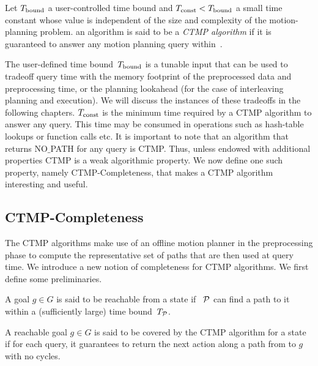 \documentclass[a4paper]{report}
\begin{document}
\begin{definition}
\label{ctmp:def}
Let $T_{\textrm{bound}}$ a user-controlled time bound
and
$T_{\textrm{const}} < T_{\textrm{bound}}$ a small time constant whose value is independent of the size and complexity of the motion-planning problem.
%
an algorithm is said to be a \emph{CTMP algorithm} if it is guaranteed to answer any motion planning query within~\Tbound.
\end{definition}

The user-defined time bound~$T_{\textrm{bound}}$ is a tunable input that can be used to tradeoff query time with the memory footprint of the preprocessed data and preprocessing time, or the planning lookahead (for the case of interleaving planning and execution). We will discuss the instances of these tradeoffs in the following chapters.
%
$T_{\textrm{const}}$ is the minimum time required by a CTMP algorithm to answer any query. This time may be consumed in operations such as hash-table lookups or function calls etc.
%
It is important to note that an algorithm that returns NO$\_$PATH for any query is CTMP. Thus, unless endowed with additional properties CTMP is a weak algorithmic property.
We now define one such property, namely CTMP-Completeness, that makes a CTMP algorithm interesting and useful.

\subsection{CTMP-Completeness}
The CTMP algorithms make use of an offline motion planner \calP in the preprocessing phase to compute the representative set of paths that are then used at query time. We introduce a new notion of completeness for CTMP algorithms. We first define some preliminaries.
\vspace{2mm}
\begin{definition}[Reachability]
\label{def:reachable}
A goal $g \in G$ is said to be reachable from a state \Sstart if~$~\mathcal{P}$ can find a path to it within a (sufficiently large) time bound~$T_\textrm{\ensuremath{\mathcal{P}}}$. 
\end{definition}

\vspace{2mm}
\begin{definition}[Coverage]
\label{def:covered}
    A reachable goal $g \in G$ is said to be covered by the CTMP algorithm for a state \Sstart if for each query, it guarantees to return the next action along a path from \Sstart to $g$ with no cycles.
\end{definition}
\end{document}
